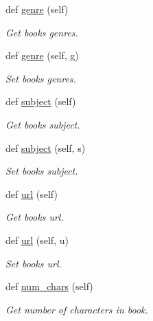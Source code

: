 \begin{DoxyCompactItemize}
def \hyperlink{classbridges_1_1data__src__dependent_1_1gutenberg__book_1_1_gutenberg_book_aa1ea7fbedf83ba41079f45272419b195}{genre} (self)
\begin{DoxyCompactList}\small\item\em Get book\textquotesingle{}s genres. \end{DoxyCompactList}\item 
def \hyperlink{classbridges_1_1data__src__dependent_1_1gutenberg__book_1_1_gutenberg_book_abee44901ee253c508d9ac291cdf8c5a4}{genre} (self, g)
\begin{DoxyCompactList}\small\item\em Set book\textquotesingle{}s genres. \end{DoxyCompactList}\item 
def \hyperlink{classbridges_1_1data__src__dependent_1_1gutenberg__book_1_1_gutenberg_book_a34c82d269f7b6adfeb66fd65be837f76}{subject} (self)
\begin{DoxyCompactList}\small\item\em Get book\textquotesingle{}s subject. \end{DoxyCompactList}\item 
def \hyperlink{classbridges_1_1data__src__dependent_1_1gutenberg__book_1_1_gutenberg_book_a693763f7e47482fd30b422a6f20d8d29}{subject} (self, s)
\begin{DoxyCompactList}\small\item\em Set book\textquotesingle{}s subject. \end{DoxyCompactList}\item 
def \hyperlink{classbridges_1_1data__src__dependent_1_1gutenberg__book_1_1_gutenberg_book_a114cfdb3aba18898c58e696343524dd5}{url} (self)
\begin{DoxyCompactList}\small\item\em Get book\textquotesingle{}s url. \end{DoxyCompactList}\item 
def \hyperlink{classbridges_1_1data__src__dependent_1_1gutenberg__book_1_1_gutenberg_book_a928fb51615de3a72c57814b143245ea9}{url} (self, u)
\begin{DoxyCompactList}\small\item\em Set book\textquotesingle{}s url. \end{DoxyCompactList}\item 
def \hyperlink{classbridges_1_1data__src__dependent_1_1gutenberg__book_1_1_gutenberg_book_ae09997a9b793fb04f81d02404e638d2c}{num\+\_\+chars} (self)
\begin{DoxyCompactList}\small\item\em Get number of characters in book. \end{DoxyCompactList}\item 

\end{DoxyCompactItemize}
